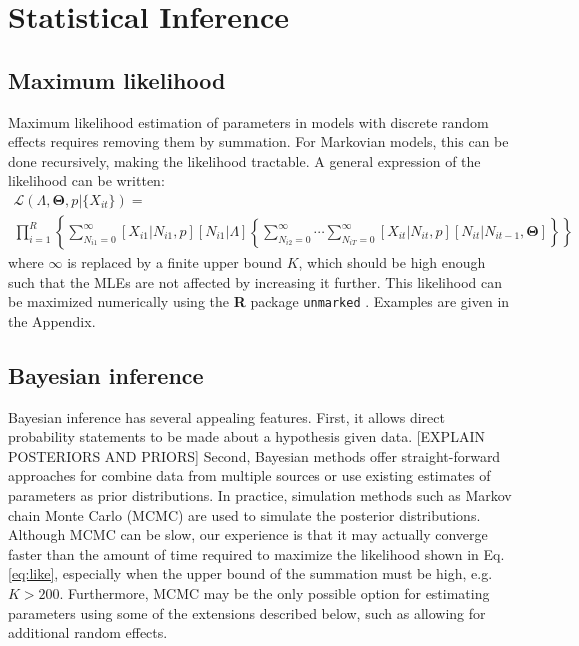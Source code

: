 \documentclass[12pt]{article}
\begin{document}
\section{Statistical Inference}

\subsection{Maximum likelihood}

Maximum likelihood estimation of parameters in models with
discrete random effects requires removing them by
summation. For Markovian models, this can be done recursively,
making the likelihood tractable. A general expression of the likelihood
can be written:
\begin{multline}
  \mathcal{L}(\Lambda, \bm{\Theta}, p | \{X_{it}\}) = \\
  \prod_{i=1}^R \left\{ \sum_{N_{i1}=0}^{\infty}
  [X_{i1}|N_{i1}, p][N_{i1}|\Lambda] \left\{
  \sum_{N_{i2}=0}^{\infty} \dotsm \sum_{N_{iT}=0}^\infty
  [X_{it}|N_{it}, p][N_{it}|N_{it-1}, \bm{\Theta}] %
  \right\} \right\}
  \label{eq:like}
\end{multline}
where $\infty$ is replaced by a finite upper bound $K$, which
should be high enough such that the MLEs are not affected by increasing
it further. This likelihood can be maximized numerically using the
\textbf{R} package \texttt{unmarked} \citep{fiske_chandler:2011}. Examples
are given in the Appendix.


\subsection{Bayesian inference}

Bayesian inference has several appealing features. First, it
allows direct probability statements to be made about a hypothesis
given data. [EXPLAIN POSTERIORS AND PRIORS]
Second, Bayesian methods offer straight-forward approaches for
combine data from multiple sources or use existing estimates of parameters as prior
distributions. In practice, simulation methods such as Markov
chain Monte Carlo (MCMC) are used to simulate the posterior
distributions. Although MCMC can be slow, our experience is that it
may actually converge faster than the amount of time required to
maximize the likelihood shown in Eq.\ref{eq:like}, especially
when the upper bound of the summation must be high, e.g. $K>200$.
Furthermore, MCMC may be the only possible option for estimating parameters
using some of the extensions described below, such as allowing for
additional random effects.
\end{document}
